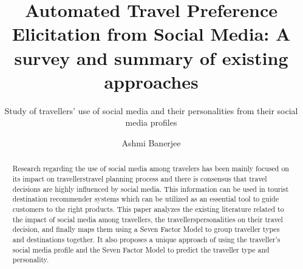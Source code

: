 \documentclass[sigconf]{acmart}
\begin{document}
\title{Automated Travel Preference Elicitation from Social Media: A survey and summary of existing approaches}
\subtitle{Study of travellers' use of social media and their personalities from their social media profiles}

\author{Ashmi Banerjee}

\renewcommand{\shortauthors}{Ashmi Banerjee}


\begin{abstract}
Research regarding the use of social media among travelers has been mainly focused on its impact on travellers\textquotesingle travel planning process and there is consensus that travel decisions are highly influenced by social media. This information can be used in tourist destination recommender systems which can be utilized as an essential tool to guide customers to the right products. This paper analyzes the existing literature related to the impact of social media among travellers, the travellers\textquotesingle  personalities on their travel decision, and finally maps them using a Seven Factor Model to group traveller types and destinations together.
It also proposes a unique approach of using the traveller's social media profile and the Seven Factor Model to predict the traveller type and personality.


\end{abstract}


\maketitle






\end{document}
